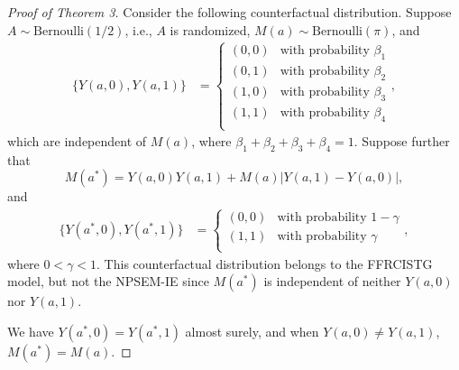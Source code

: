 \documentclass[12pt]{article}
\begin{document}
\begin{proof}[Proof of Theorem 3]
    Consider the following counterfactual distribution. Suppose $A\sim \text{Bernoulli}(1/2)$, i.e., $A$ is randomized, $M(a)\sim\text{Bernoulli}(\pi)$, and 
    \begin{align*}
        \{Y(a,0), Y(a,1)\} &= \left\{\begin{array}{ll}
            (0, 0) & \text{with probability } \beta_1 \\
            (0, 1) & \text{with probability } \beta_2 \\
            (1, 0) & \text{with probability } \beta_3 \\
            (1, 1) & \text{with probability } \beta_4 \\
        \end{array}\right.,
    \end{align*}
    which are independent of $M(a)$, where $\beta_1+\beta_2+\beta_3+\beta_4=1$. Suppose further that 
    \[M(a^*)=Y(a,0)Y(a,1) + M(a)\lvert Y(a,1)-Y(a,0)\rvert,\] 
    and
    \begin{align*}
        \{Y(a^*,0), Y(a^*,1)\} &= \left\{\begin{array}{ll}
            (0, 0) & \text{with probability } 1-\gamma \\
            (1, 1) & \text{with probability } \gamma \\
        \end{array}\right.,
    \end{align*}
    where $0<\gamma<1$. This counterfactual distribution belongs to the FFRCISTG model, but not the NPSEM-IE since $M(a^*)$ is independent of neither $Y(a,0)$ nor $Y(a,1)$. 
    
    We have $Y(a^*,0) = Y(a^*,1)$ almost surely, and when $Y(a,0)\neq Y(a,1)$, $M(a^*)=M(a)$. 
\begin{comment}    
    When $M(a)=0$, we have %
    \begin{align*}
        Y\{a,M(a^*)\} &= Y(a,0)\{1-M(a^*)\} + Y(a,1)M(a^*)\\
        &= Y(a,0)\{1-Y(a,0)Y(a,1)\} + Y(a,0)Y(a,1)^2\\
        &= Y(a,0) - Y(a,0)Y(a,1) + Y(a,0)Y(a,1)\\
        &= Y\{a,M(a)\}.
    \end{align*}


\end{comment}
\end{proof}
\end{document}
